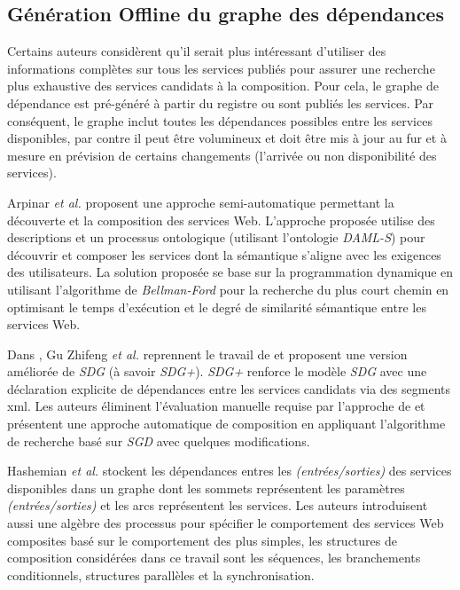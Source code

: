   \subsection{Génération Offline du graphe des dépendances}
  \label{sec:generation-offline}
  Certains auteurs considèrent qu'il serait plus intéressant
  d'utiliser des informations complètes sur tous les services publiés
  pour assurer une recherche plus exhaustive des services candidats à
  la composition. Pour cela, le graphe de dépendance est pré-généré à
  partir du registre ou sont publiés les services. Par conséquent, le
  graphe inclut toutes les dépendances possibles entre les services
  disponibles, par contre il peut être volumineux et doit être mis à
  jour au fur et à mesure en prévision de certains changements (l'arrivée ou non
  disponibilité des services).\bigskip

  Arpinar \textit{et al.} \cite{arpinar2005ontology} proposent une
  approche semi-automatique permettant la découverte et la composition
  des services Web. L'approche proposée utilise des descriptions et un
  processus ontologique (utilisant l'ontologie \textit{DAML-S}) pour
  découvrir et composer les services dont la sémantique s'aligne avec
  les exigences des utilisateurs. La solution proposée se base sur la
  programmation dynamique en utilisant l'algorithme de
  \textit{Bellman-Ford} pour la recherche du plus court chemin en
  optimisant le temps d'exécution et le degré de similarité sémantique
  entre les services Web.\bigskip

  Dans \cite{gu2008automatic}, Gu Zhifeng \textit{et al.} reprennent
  le travail de \cite{liang2005and} et proposent une version améliorée
  de \textit{SDG} (à savoir \textit{SDG+}). \textit{SDG+} renforce le
  modèle \textit{SDG} avec une déclaration explicite de dépendances
  entre les services candidats via des segments \acrshort{xml}. Les
  auteurs éliminent l'évaluation manuelle requise par l'approche de
  \cite{liang2005and} et présentent une approche automatique de
  composition en appliquant l'algorithme de recherche basé sur
  \textit{SGD} avec quelques modifications.\bigskip

  Hashemian \textit{et al.} \cite{hashemian2006graph} stockent les
  dépendances entres les \textit{(entrées/sorties)} des services
  disponibles dans un graphe dont les sommets représentent les
  paramètres \textit{(entrées/sorties)} et les arcs représentent les
  services. Les auteurs introduisent aussi une algèbre des processus
  pour spécifier le comportement des services Web composites basé sur
  le comportement des plus simples, les structures de composition
  considérées dans ce travail sont les séquences, les branchements
  conditionnels, structures parallèles et la synchronisation.

